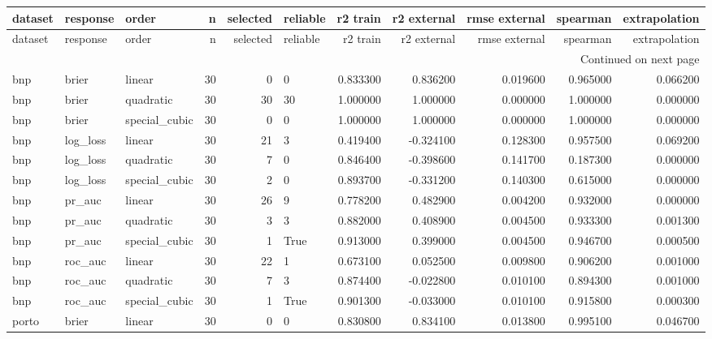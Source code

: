 \begin{center}\label{tab:s3orders}\end{center}
\begingroup\tiny\setlength{\tabcolsep}{2.5pt}
\begin{longtable}{lllrrlrrrrr}
\toprule
dataset & response & order & n & selected & reliable & r2 train & r2 external & rmse external & spearman & extrapolation \\
\midrule
\endfirsthead
\toprule
dataset & response & order & n & selected & reliable & r2 train & r2 external & rmse external & spearman & extrapolation \\
\midrule
\endhead
\midrule
\multicolumn{11}{r}{Continued on next page} \\
\midrule
\endfoot
\bottomrule
\endlastfoot
bnp & brier & linear & 30 & 0 & 0 & 0.833300 & 0.836200 & 0.019600 & 0.965000 & 0.066200 \\
bnp & brier & quadratic & 30 & 30 & 30 & 1.000000 & 1.000000 & 0.000000 & 1.000000 & 0.000000 \\
bnp & brier & special\_cubic & 30 & 0 & 0 & 1.000000 & 1.000000 & 0.000000 & 1.000000 & 0.000000 \\
bnp & log\_loss & linear & 30 & 21 & 3 & 0.419400 & -0.324100 & 0.128300 & 0.957500 & 0.069200 \\
bnp & log\_loss & quadratic & 30 & 7 & 0 & 0.846400 & -0.398600 & 0.141700 & 0.187300 & 0.000000 \\
bnp & log\_loss & special\_cubic & 30 & 2 & 0 & 0.893700 & -0.331200 & 0.140300 & 0.615000 & 0.000000 \\
bnp & pr\_auc & linear & 30 & 26 & 9 & 0.778200 & 0.482900 & 0.004200 & 0.932000 & 0.000000 \\
bnp & pr\_auc & quadratic & 30 & 3 & 3 & 0.882000 & 0.408900 & 0.004500 & 0.933300 & 0.001300 \\
bnp & pr\_auc & special\_cubic & 30 & 1 & True & 0.913000 & 0.399000 & 0.004500 & 0.946700 & 0.000500 \\
bnp & roc\_auc & linear & 30 & 22 & 1 & 0.673100 & 0.052500 & 0.009800 & 0.906200 & 0.001000 \\
bnp & roc\_auc & quadratic & 30 & 7 & 3 & 0.874400 & -0.022800 & 0.010100 & 0.894300 & 0.001000 \\
bnp & roc\_auc & special\_cubic & 30 & 1 & True & 0.901300 & -0.033000 & 0.010100 & 0.915800 & 0.000300 \\
porto & brier & linear & 30 & 0 & 0 & 0.830800 & 0.834100 & 0.013800 & 0.995100 & 0.046700 \\

\end{longtable}
